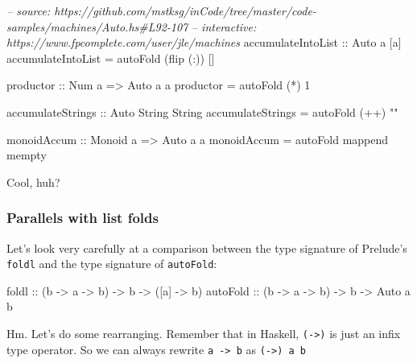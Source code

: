\documentclass[]{article}
\newenvironment{Shaded}{}{}
\newcommand{\DataTypeTok}[1]{\textcolor[rgb]{0.56,0.13,0.00}{{#1}}}
\newcommand{\DecValTok}[1]{\textcolor[rgb]{0.25,0.63,0.44}{{#1}}}
\newcommand{\StringTok}[1]{\textcolor[rgb]{0.25,0.44,0.63}{{#1}}}
\newcommand{\CommentTok}[1]{\textcolor[rgb]{0.38,0.63,0.69}{\textit{{#1}}}}
\newcommand{\OtherTok}[1]{\textcolor[rgb]{0.00,0.44,0.13}{{#1}}}
\newcommand{\FunctionTok}[1]{\textcolor[rgb]{0.02,0.16,0.49}{{#1}}}
\newcommand{\NormalTok}[1]{{#1}}
\begin{document}
\begin{Shaded}
\begin{Highlighting}[]
\CommentTok{-- source: https://github.com/mstksg/inCode/tree/master/code-samples/machines/Auto.hs#L92-107}
\CommentTok{-- interactive: https://www.fpcomplete.com/user/jle/machines}
\OtherTok{accumulateIntoList ::} \DataTypeTok{Auto} \NormalTok{a [a]}
\NormalTok{accumulateIntoList }\FunctionTok{=} \NormalTok{autoFold (flip (}\FunctionTok{:}\NormalTok{)) []}

\OtherTok{productor ::} \DataTypeTok{Num} \NormalTok{a }\OtherTok{=>} \DataTypeTok{Auto} \NormalTok{a a}
\NormalTok{productor }\FunctionTok{=} \NormalTok{autoFold (}\FunctionTok{*}\NormalTok{) }\DecValTok{1}

\OtherTok{accumulateStrings ::} \DataTypeTok{Auto} \DataTypeTok{String} \DataTypeTok{String}
\NormalTok{accumulateStrings }\FunctionTok{=} \NormalTok{autoFold (}\FunctionTok{++}\NormalTok{) }\StringTok{""}

\OtherTok{monoidAccum ::} \DataTypeTok{Monoid} \NormalTok{a }\OtherTok{=>} \DataTypeTok{Auto} \NormalTok{a a}
\NormalTok{monoidAccum }\FunctionTok{=} \NormalTok{autoFold mappend mempty}
\end{Highlighting}
\end{Shaded}

Cool, huh?

\subsubsection{Parallels with list
folds}\label{parallels-with-list-folds}

Let's look very carefully at a comparison between the type signature of
Prelude's \texttt{foldl} and the type signature of \texttt{autoFold}:

\begin{Shaded}
\begin{Highlighting}[]
\NormalTok{foldl}\OtherTok{      ::} \NormalTok{(b }\OtherTok{->} \NormalTok{a }\OtherTok{->} \NormalTok{b) }\OtherTok{->} \NormalTok{b }\OtherTok{->} \NormalTok{([a] }\OtherTok{->} \NormalTok{b)}
\OtherTok{autoFold   ::} \NormalTok{(b }\OtherTok{->} \NormalTok{a }\OtherTok{->} \NormalTok{b) }\OtherTok{->} \NormalTok{b }\OtherTok{->}  \DataTypeTok{Auto} \NormalTok{a b}
\end{Highlighting}
\end{Shaded}

Hm. Let's do some rearranging. Remember that in Haskell,
\texttt{(-\textgreater{})} is just an infix type operator. So we can
always rewrite \texttt{a\ -\textgreater{}\ b} as
\texttt{(-\textgreater{})\ a\ b}
\end{document}
